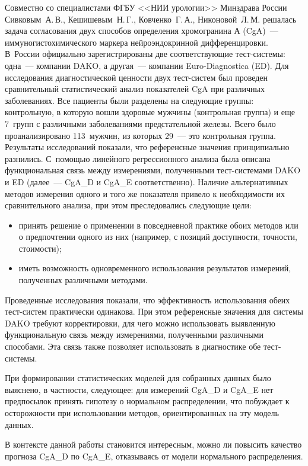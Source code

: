 \begin{multicols}{2}
Совместно со специалистами ФГБУ <<НИИ урологии>> Минздрава России
Сивковым~А.\,В., Кешишевым~Н.\,Г., Ковченко~Г.\,А., Никоновой~Л.\,М.
реша\-лась задача согласования двух способов определения
хромогранина А (CgA)~--- иммуногистохимического маркера
нейроэндокринной дифференцировки. В~России официально зарегистрированы
две соответствующие тест-сис\-те\-мы: одна~--- компании DAKO, а другая~---
компании Euro-Diagnostica (ED). Для исследования диагностической цен\-ности
двух тест-сис\-тем был проведен сравнительный статистический анализ
показателей CgA при различных заболеваниях. Все пациенты были разделены
на следующие группы: контрольную, в которую вошли здоровые мужчины
(контрольная группа) и еще 7~групп с различными заболеваниями предстательной
железы. Всего было проанализировано 113~мужчин, из которых 29~--- это
контрольная группа. Результаты исследований показали, что референсные
значения принципиально разнились.
С~по\-мощью линейного
регрессионного анализа была описана функциональная связь между
измерениями, полученными тест-сис\-те\-ма\-ми DAKO и ED (далее~--- CgA\_D
и CgA\_E соответственно). Наличие альтернативных методов измерения одного
и того же показателя привело к необходимости их сравнительного анализа, при
этом преследовались следующие цели:
     \begin{itemize}
\item принять решение о применении в повседневной практике обоих
методов или о предпочтении одного из них (например, с позиций
доступности, точности, стоимости);
\item иметь возможность одновременного использования результатов
измерений, полученных различными методами.
\end{itemize}

     Проведенные исследования показали, что эффективность использования
обеих тест-сис\-тем практически одинакова. При этом референсные значения
для системы DAKO требуют корректировки, для чего можно использовать
выявленную функциональную связь между измерениями, полученными
различными способами. Эта связь также позволяет использовать в диагностике
обе тест-сис\-темы.

     При формировании статистических моделей для собранных данных было
выяснено, в част\-ности, следующее: для измерений CgA\_D и
CgA\_E нет предпосылок принять гипотезу о нормальном распределении, что
побуждает к осторожности при использовании методов, ориентированных на
эту модель данных.

     В контексте данной работы становится интересным, можно ли повысить
качество прогноза CgA\_D по CgA\_E, отказываясь от модели нормального
распределения.


\end{multicols}
